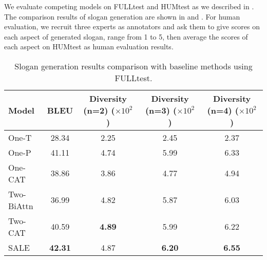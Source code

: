 
We evaluate competing models on FULLtest and HUMtest 
as we described in .
The comparison results of slogan generation are shown in 
 and .
For human evaluation, we recruit three experts as annotators 
and ask them to give scores on each aspect of generated slogan, 
range from 1 to 5,
then average the scores of each aspect on HUMtest as 
human evaluation results.


\begin{table*}[th]
	\centering
	\caption{Slogan generation results comparison with baseline methods using FULLtest.}
	\label{tab:auto_eval}
	\begin{tabular}{lcccc}
		\hline
		Model %
		& BLEU &  Diversity (n=2) ($\times 10^2$ )& Diversity (n=3) ($\times 10^2$ ) & Diversity (n=4) ($\times 10^2$ ) \\
		\hline
		One-T %
		&  28.34 &  2.25   &  2.45  &  2.37 \\
		One-P %
		&  41.11 &   4.74 &    5.99 & 6.33 \\
		One-CAT  %
		& 38.86  &  3.86 &  4.77  & 4.94 \\
		Two-BiAttn  %
		& 36.99  &  4.82 &  5.87  &  6.03   \\
		Two-CAT %
		& 40.59  &  \textbf{4.89} &  5.99  &  6.22 \\
		SALE %
		& \textbf{42.31}  & 4.87  &  \textbf{6.20} &  \textbf{6.55}  \\
		\hline 
	\end{tabular}
\end{table*}



